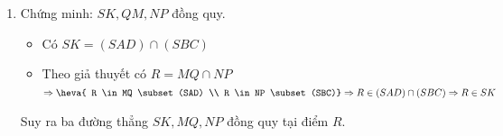 \begin{bt}
\begin{vd}
{\begin{enumerate}
			\begin{itemize}
				\item Có $SE=(SAB) \cap (SCD)$
				\item Theo giả thuyết có $H=MN \cap PQ$\\
				$\Rightarrow\heva{H \in MN \subset(SAB) \\ H \in PQ \subset (SCD)}\\
				\Rightarrow H \in (SAB) \cap (SCD)\Rightarrow H \in SE$
			\end{itemize}
			Suy ra ba điểm điểm $S, H, E$ thẳng hàng.
			\item Chứng minh: $SK, QM, NP$ đồng quy.
			\begin{itemize}
				\item Có $SK = (SAD) \cap (SBC)$
				\item Theo giả thuyết có $ R = MQ \cap NP$\\
				$\Rightarrow \heva{ R \in MQ \subset(SAD) \\ R \in NP \subset(SBC)}\\
				\Rightarrow R \in(SAD) \cap (SBC) \Rightarrow R \in SK$ 
			\end{itemize}
			Suy ra ba đường thẳng $SK, MQ, NP$ đồng quy tại điểm $R$.
		\end{enumerate}
	}
\end{vd}

\end{bt}
